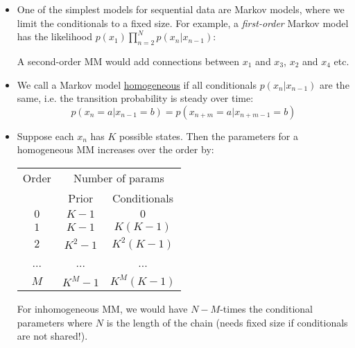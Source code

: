 \begin{itemize}
	\item One of the simplest models for sequential data are Markov models, where we limit the conditionals to a fixed size. For example, a \textit{first-order} Markov model has the likelihood $p(x_1)\prod_{n=2}^{N}p(x_n|x_{n-1})$:
	
	\begin{figure}[ht!]
		\centering
	\end{figure}

	A second-order MM would add connections between $x_1$ and $x_3$, $x_2$ and $x_4$ etc.
	\item We call a Markov model \underline{homogeneous} if all conditionals $p(x_{n}|x_{n-1})$ are the same, i.e. the transition probability is steady over time:
	$$p(x_{n}=a|x_{n-1}=b) = p(x_{n+m}=a|x_{n+m-1}=b)$$
	\item Suppose each $x_n$ has $K$ possible states. Then the parameters for a homogeneous MM increases over the order by:
	\begin{table}[ht!]
		\centering
		\begin{tabular}{c|cc}
			Order & \multicolumn{2}{c}{Number of params}\\
			& Prior & Conditionals\\
			\hline 
			$0$ & $K-1$ & $0$\\
			$1$ & $K-1$ & $K(K-1)$\\
			$2$ & $K^2 - 1$ & $K^2(K-1)$\\
			... & ... & ...\\
			$M$ & $K^{M}-1$ & $K^{M}(K-1)$\\
		\end{tabular}
	\end{table}
	For inhomogeneous MM, we would have $N-M$-times the conditional parameters where $N$ is the length of the chain (needs fixed size if conditionals are not shared!). 
	

\end{itemize}

